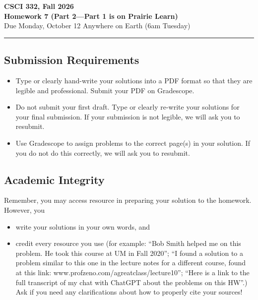 \documentclass[11pt]{article}
\begin{document}
\begin{center}
\Large\textbf{CSCI 332, Fall 2026}%
\\
\LARGE\textbf{Homework 7 (Part 2---Part 1 is on Prairie Learn)}%
\\[0.5ex]
\large Due Monday, October 12 Anywhere on Earth (6am Tuesday)
\end{center}

\bigskip
\hrule
\bigskip

\subsection*{Submission Requirements}
\begin{itemize}
    \item Type or clearly hand-write your solutions into a PDF format so that they are legible and professional. Submit your PDF on Gradescope. 
    \item Do not submit your first draft. Type or clearly re-write your solutions for your final submission. If your submission is not legible, we will ask you to resubmit.
    \item Use Gradescope to assign problems to the correct page(s) in your solution. If you do not do this correctly, we will ask you to resubmit.
\end{itemize}

\subsection*{Academic Integrity}

Remember, you may access  resource in preparing your solution to the homework. However, you 
\begin{itemize}
    \item write your solutions in your own words, and
    \item credit every resource you use (for example: ``Bob Smith helped me on
    this problem. He took this course at UM in Fall 2020''; ``I found a solution
    to a problem similar to this one in the lecture notes for a different
    course, found at this link: www.profzeno.com/agreatclass/lecture10''; ``Here is a link to the full transcript of my chat with ChatGPT about the problems on this HW''.)
    Ask if you need any clarifications about how to properly cite your sources!
\end{itemize}




\newpage
    
\end{document}
